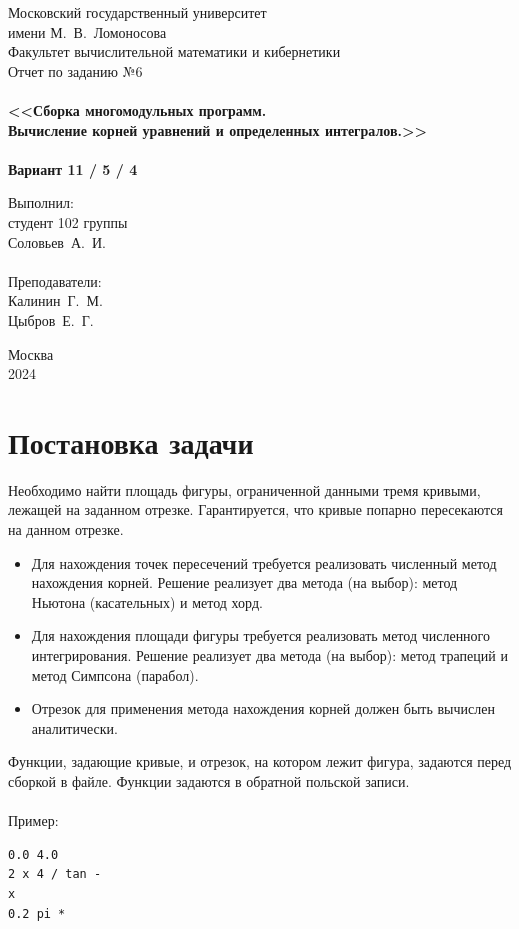 \documentclass[a4paper,12pt,titlepage,finall]{article}
\begin{document}
\begin{titlepage}
    \begin{center}
	{\small \sc Московский государственный университет \\имени М.~В.~Ломоносова\\
	Факультет вычислительной математики и кибернетики\\}
	\vfill
	{\Large \sc Отчет по заданию №6}\\
	~\\
	{\large \bf <<Сборка многомодульных программ. \\
	Вычисление корней уравнений и определенных интегралов.>>}\\ 
	~\\
	{\large \bf Вариант 11 / 5 / 4}
    \end{center}
    \begin{flushright}
	\vfill {Выполнил:\\
	студент 102 группы\\
	Соловьев~А.~И.\\
	~\\
	Преподаватели:\\
	Калинин~Г.~М.\\Цыбров~Е.~Г.}
    \end{flushright}
    \begin{center}
	\vfill
	{\small Москва\\2024}
    \end{center}
\end{titlepage}

\tableofcontents
\newpage

\section{Постановка задачи}

Необходимо найти площадь фигуры, ограниченной данными тремя кривыми, лежащей на заданном отрезке. Гарантируется, что кривые попарно пересекаются на данном отрезке. 
\begin{itemize}
    \item Для нахождения точек пересечений требуется реализовать численный метод нахождения корней. Решение реализует два метода (на выбор): метод Ньютона (касательных) и метод хорд.
    \item Для нахождения площади фигуры требуется реализовать метод численного интегрирования. Решение реализует два метода (на выбор): метод трапеций и метод Симпсона (парабол).
\item Отрезок для применения метода нахождения корней должен быть вычислен аналитически.
\end{itemize}
Функции, задающие кривые, и отрезок, на котором лежит фигура, задаются перед сборкой в файле. Функции задаются в обратной польской записи.\\\\
Пример:
\begin{verbatim}
0.0 4.0
2 x 4 / tan -
x
0.2 pi *
\end{verbatim}
\end{document}
